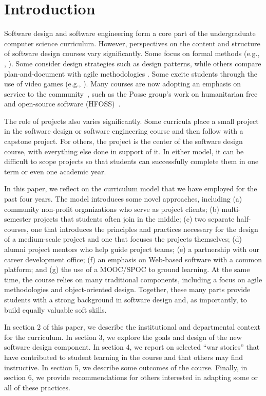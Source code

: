 
\section{Introduction}

Software design and software engineering form a core part of
the undergraduate computer science curriculum. However, perspectives
on the content and structure of software design courses vary
significantly.  Some focus on formal methods (e.g., \cite{liu-2005},
\cite{garcia-2014}).  Some consider design strategies such as design
patterns, while others compare plan-and-document with agile
methodologies \cite{gestwicki-2018}.  Some excite students through
the use of video games (e.g., \cite{wolz-2007,sweedyk-2005,sweedyk-2011}).  
Many courses are
now adopting an emphasis on service to the community~\cite{hfoss-2018,buckley-2004,liu-2005,leidig-2006,lange-2011},
such as the Posse group's work on humanitarian free and open-source
software (HFOSS)~\cite{posse-2018}.

The role of projects also varies significantly.  Some curricula
place a small project in the software design or software engineering
course and then follow with a capstone project.  For others, the
project is the center of the software design course, with everything
else done in support of it. In either model, it can be difficult
to scope projects so that students can successfully complete them
in one term or even one academic year.

In this paper, we reflect on the curriculum model that we have
employed for the past four years.  The model introduces some novel
approaches, including (a) community non-profit organizations who
serve as project clients; (b) multi-semester projects that students
often join in the middle; (c) two separate half-courses, one that
introduces the principles and practices necessary for the design
of a medium-scale project and one that focuses the projects themselves;
(d) alumni project mentors who help guide project teams; (e) a
partnership with our career development office; (f) an emphasis on
Web-based software with a common platform; and (g) the use of a
MOOC/SPOC to ground learning.  At the same time, the course relies
on many traditional components, including a focus on agile methodologies
and object-oriented design.  Together, these many parts provide
students with a strong background in software design and, as
importantly, to build equally valuable soft skills.

In section 2 of this paper, we describe the institutional and
departmental context for the curriculum.  In section 3, we explore
the goals and design of the new software design component.  In
section 4, we report on selected ``war stories'' that have contributed
to student learning in the course and that others may find instructive.
In section 5, we describe some outcomes of the course.  Finally,
in section 6, we provide recommendations for others interested in
adapting some or all of these practices.

